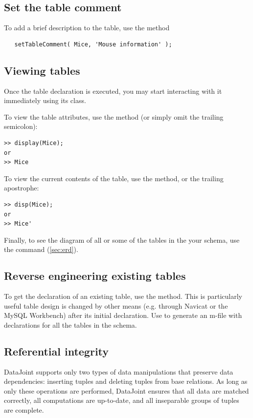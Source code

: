 \documentclass[10pt]{article}
\begin{document}
\subsection{Set the table comment}
To add a brief description to the table, use the  method
\begin{lstlisting}
   setTableComment( Mice, 'Mouse information' );
\end{lstlisting}

\subsection{Viewing tables}
Once the table declaration is executed, you may start interacting with it immediately using its class.

To view the table attributes, use the  method (or simply omit the trailing semicolon):
\begin{lstlisting}
>> display(Mice);
or
>> Mice
\end{lstlisting}

To view the current contents of the table, use the  method, or the trailing apostrophe:
\begin{lstlisting}
>> disp(Mice);
or
>> Mice'
\end{lstlisting}

Finally, to see the diagram of all or some of the tables in the your schema, use the  command (\autoref{sec:erd}).

\subsection{Reverse engineering existing tables}
To get the  declaration of an existing table, use the  method. This is particularly useful table design is changed by other means (e.g. through Navicat or the MySQL Workbench) after its initial declaration. Use  to generate an m-file with declarations for all the tables in the schema.


\subsection{Referential integrity}
DataJoint supports only two types of data manipulations that preserve data dependencies: inserting tuples and deleting tuples from base relations. As long as only these operations are performed, DataJoint ensures that all data are matched correctly, all computations are up-to-date, and all inseparable groups of tuples are complete.
\end{document}
